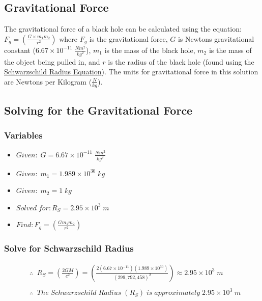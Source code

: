 \documentclass{article}
\begin{document}
\subsection{Gravitational Force}
The gravitational force of a black hole can be calculated using the equation: $F_g = \left(\frac{G\times m_1m_2}{r^2}\right)$ where $F_g$ is the gravitational force, $G$ is Newtons gravitational constant (\hyperref[sec:constants]{$6.67 \times 10^{-11}\;\frac{Nm^2}{kg^2}$}), $m_1$ is the mass of the black hole, $m_2$ is the mass of the object being pulled in, and $r$ is the radius of the black hole (found using the \hyperref[sec:schwarzschild_radius_equation]{Schwarzschild Radius Equation}). The units for gravitational force in this solution are Newtons per Kilogram ($\frac{N}{kg}$).

\subsection{Solving for the Gravitational Force}
\subsubsection{Variables}
\begin{itemize}
    \item $Given:\; G = 6.67 \times 10^{-11}\;\frac{Nm^2}{kg^2}$
    \item $Given:\; m_1 = 1.989\times 10^{30}\;kg$
    \item $Given:\; m_2 = 1\;kg$
    \item $Solved\; for: R_S = 2.95 \times 10^{3}\;m$
    \item $Find: F_g = \left(\frac{Gm_1m_2}{r^2}\right)$
\end{itemize}\leavevmode

\subsubsection{Solve for Schwarzschild Radius}
\begin{align*}
     & \therefore\;\; R_{S} = \left(\frac{2GM}{c^2}\right) = \left(\frac{2(6.67 \times 10^{-11})(1.989\times 10^{30})}{(299,792,458)^2}\right) \approx 2.95 \times 10^{3} \;m \\\\
     & \therefore\;\; The\; Schwarzschild\; Radius\; (R_{S})\; is\; approximately\; 2.95 \times 10^{3} \;m
\end{align*}\leavevmode
\end{document}
